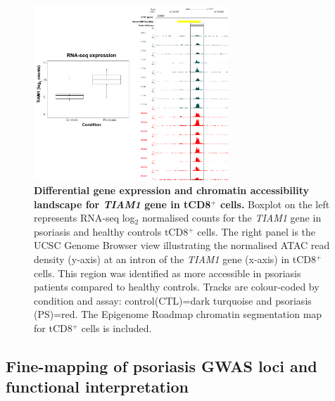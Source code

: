 
\begin{figure}[htbp]
\centering
\includegraphics[width=0.65\textwidth]{./Results2/pdfs/ATAC_CD8_peak_TIAM1_RNA_combined}
\caption[Differential gene expression and chromatin accessibility landscape for \textit{TIAM1} gene in tCD8$^+$ cells.]{\textbf{Differential gene expression and chromatin accessibility landscape for \textit{TIAM1} gene in tCD8$^+$ cells.} Boxplot on the left represents RNA-seq log$_{2}$ normalised counts for the \textit{TIAM1} gene in psoriasis and healthy controls tCD8$^+$ cells. The right panel is the UCSC Genome Browser view illustrating the normalised ATAC read density (y-axis) at an intron of the \textit{TIAM1} gene (x-axis) in tCD8$^+$ cells. This region was identified as more accessible in psoriasis patients compared to healthy controls. Tracks are colour-coded by condition and assay: control(CTL)=dark turquoise and psoriasis (PS)=red. The Epigenome Roadmap chromatin segmentation map for tCD8$^+$ cells is included.}
\label{figure:ATAC_RNAseq_CD8_TIAM1_combined}
\end{figure}



\subsection{Fine-mapping of psoriasis GWAS loci and functional interpretation}

